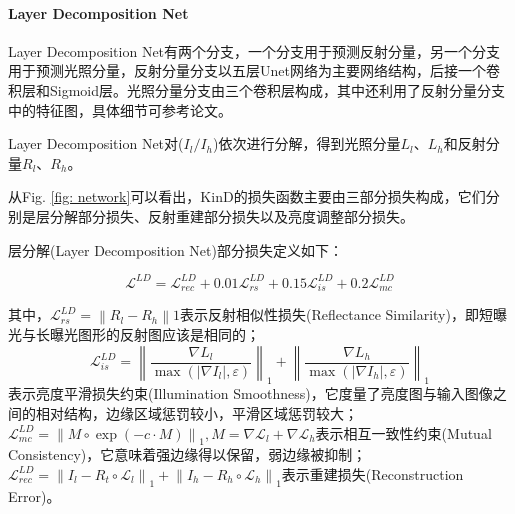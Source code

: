 \documentclass[letterpaper,12pt]{article}
\begin{document}
			\paragraph{Layer Decomposition Net}
		
				Layer Decomposition Net有两个分支，一个分支用于预测反射分量，另一个分支用于预测光照分量，反射分量分支以五层Unet网络为主要网络结构，后接一个卷积层和Sigmoid层。光照分量分支由三个卷积层构成，其中还利用了反射分量分支中的特征图，具体细节可参考论文。
				
				Layer Decomposition Net对($I_l / I_h$)依次进行分解，得到光照分量$L_l$、$L_h$和反射分量$R_l$、$R_h$。
				
				从Fig. \ref{fig: network}可以看出，KinD的损失函数主要由三部分损失构成，它们分别是层分解部分损失、反射重建部分损失以及亮度调整部分损失。
				
				层分解(Layer Decomposition Net)部分损失定义如下：
		
			\begin{equation}
				\mathcal{L}^{LD}=\mathcal{L}_{rec}^{LD}+0.01\mathcal{L}_{rs}^{LD}+0.15\mathcal{L}_{is}^{LD}+0.2\mathcal{L}_{mc}^{LD}
			\end{equation}
			
			其中，$\mathcal{L}_{rs}^{LD}=\left\|R_l-R_h\right\|1$表示反射相似性损失(Reflectance Similarity)，即短曝光与长曝光图形的反射图应该是相同的；$$\mathcal{L}_{is}^{LD}=\left\| \frac{\nabla L_{l}}{\max(\left| \nabla I_{l} \right|,\varepsilon)} \right\|_{1} + \left\| {\frac{\nabla L_{h}}{\max (\left| \nabla I_{h} \right| ,\varepsilon)}}\right\|_{1}$$表示亮度平滑损失约束(Illumination Smoothness)，它度量了亮度图与输入图像之间的相对结构，边缘区域惩罚较小，平滑区域惩罚较大；$\mathcal{L}_{mc}^{LD}={\left\|M\circ\exp(-c\cdot M)\right \|}_{1}, M=\nabla \mathcal{L}_{l}+\nabla \mathcal{L}_{h}$表示相互一致性约束(Mutual Consistency)，它意味着强边缘得以保留，弱边缘被抑制；$\mathcal{L}_{rec}^{LD}={\left \| I_l-R_t \circ \mathcal{L}_l\right\|}_{1} + {\left \| I_h-R_h \circ \mathcal{L}_h\right\|}_{1}$表示重建损失(Reconstruction Error)。
		
\end{document}
